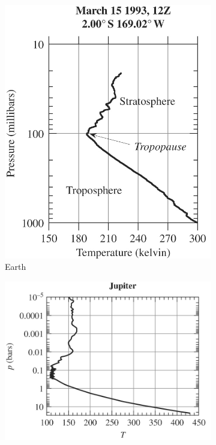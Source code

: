 \begin{figure}[H]
    \begin{subfigure}[t]{0.24\linewidth}
        \includegraphics[width=\linewidth]{Figures/Thermodynamics/Earth Temperature Profile Radiosonde.png}
        \caption{Earth}
    \end{subfigure}
    \begin{subfigure}[t]{0.3\linewidth}
        \includegraphics[width=\linewidth]{Figures/Thermodynamics/Jupiter Radiosonde.png}

\end{subfigure}
\end{figure}
